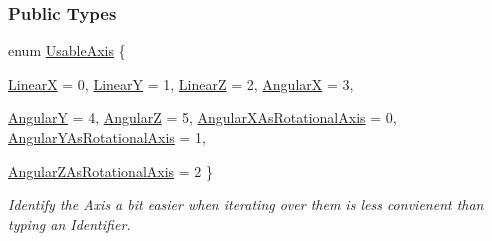 \subsubsection*{Public Types}
\begin{DoxyCompactItemize}
\item 
enum \hyperlink{classphys_1_1Generic6DofConstraint_a70c7ba15366ae33deaf8e042b32f8e02}{UsableAxis} \{ \par
\hyperlink{classphys_1_1Generic6DofConstraint_a70c7ba15366ae33deaf8e042b32f8e02a5ef49026220dd58b86161c81acbbd6dd}{LinearX} =  0, 
\hyperlink{classphys_1_1Generic6DofConstraint_a70c7ba15366ae33deaf8e042b32f8e02a6e37a2dd1d57941c9a553beafa4d6fdc}{LinearY} =  1, 
\hyperlink{classphys_1_1Generic6DofConstraint_a70c7ba15366ae33deaf8e042b32f8e02aeafe17c41aa044f629ec8e281f7246bc}{LinearZ} =  2, 
\hyperlink{classphys_1_1Generic6DofConstraint_a70c7ba15366ae33deaf8e042b32f8e02aed4a0ff962fca6d6fb8fc959cbb92307}{AngularX} =  3, 
\par
\hyperlink{classphys_1_1Generic6DofConstraint_a70c7ba15366ae33deaf8e042b32f8e02a04db59424ab51741ffb4562d74273890}{AngularY} =  4, 
\hyperlink{classphys_1_1Generic6DofConstraint_a70c7ba15366ae33deaf8e042b32f8e02a8d692d7733c08eeb3602f85749a92f52}{AngularZ} =  5, 
\hyperlink{classphys_1_1Generic6DofConstraint_a70c7ba15366ae33deaf8e042b32f8e02ab9261238c5de9f41f18865e3bccb7799}{AngularXAsRotationalAxis} =  0, 
\hyperlink{classphys_1_1Generic6DofConstraint_a70c7ba15366ae33deaf8e042b32f8e02a3caaf6426bbdc88722b82ee81329d124}{AngularYAsRotationalAxis} =  1, 
\par
\hyperlink{classphys_1_1Generic6DofConstraint_a70c7ba15366ae33deaf8e042b32f8e02aa8483679a74ab6fbfbb88c647600653d}{AngularZAsRotationalAxis} =  2
 \}
\begin{DoxyCompactList}\small\item\em Identify the Axis a bit easier when iterating over them is less convienent than typing an Identifier. \item\end{DoxyCompactList}\end{DoxyCompactItemize}
